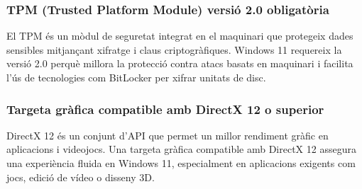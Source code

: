 \documentclass[
  12 pt,
  a4paper,
]{article}
\begin{document}
\subsubsection{TPM (Trusted Platform Module) versió 2.0
obligatòria}\label{tpm-trusted-platform-module-versiuxf3-2.0-obligatuxf2ria}

El TPM és un mòdul de seguretat integrat en el maquinari que protegeix
dades sensibles mitjançant xifratge i claus criptogràfiques. Windows 11
requereix la versió 2.0 perquè millora la protecció contra atacs basats
en maquinari i facilita l'ús de tecnologies com BitLocker per xifrar
unitats de disc.

\subsubsection{Targeta gràfica compatible amb DirectX 12 o
superior}\label{targeta-gruxe0fica-compatible-amb-directx-12-o-superior}

DirectX 12 és un conjunt d'API que permet un millor rendiment gràfic en
aplicacions i videojocs. Una targeta gràfica compatible amb DirectX 12
assegura una experiència fluida en Windows 11, especialment en
aplicacions exigents com jocs, edició de vídeo o disseny 3D.
\end{document}
